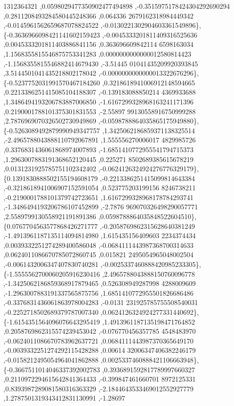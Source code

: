 \begin{DoxyCode}
      1312364321 ,0.0598029477350902477494898 ,-0.3515975178424304292690294 ,0.2811208493284580445248366 ,0.064336
      2679162318984449342 ,-0.0145961562659687078824522 ,-0.0130221302904603361549896\},
\{-0.3636966098421141602159423 ,-0.0045333201811409316525636 ,0.0045333201811403886841156 ,0.363696609842114
      6598163034 ,1.1568355815546875753341283 ,0.0000000000000012580814423 ,-1.1568355815546882414679430 ,-3.51445
      01041435209920393845 ,3.5144501041435218802178042 ,-0.0000000000000013322676296\},
\{-0.5237752031991570467184260 ,0.3218618941006912148594665 ,0.2213386251415085104188307 ,-0.139183088850214
      4369933688 ,1.3486494193206783887006850 ,-1.6167299328968163241171396 ,0.2190001788101375301831553 ,-2.55897
      99130558916750999288 ,2.7876969070326502730949869 ,-0.0598788864035865175949880\},
\{-0.5263089492879990949347757 ,1.3425062186859371138325514 ,-2.4965788043888110792067891 ,1.555556270006017
      4829985726 ,0.3376831436061868974007893 ,-1.6851410772955541794715373 ,1.2963007883191368652120445 ,0.225271
      8502689385615678219 ,0.0131231925785751102342402 ,-0.0624126324924276776329179\},
\{0.1391830888502155194608179 ,-0.2213386251415099814643384 ,-0.3218618941006907152591054 ,0.523775203199156
      8246738211 ,-0.2190001788101379742723651 ,1.6167299328968178784293741 ,-1.3486494193206786107452899 ,-2.7876
      969070326498290057771 ,2.5589799130558921191891386 ,0.0598788864035848522604510\},
\{0.0767704563577868426271777 ,-0.2058769862315628640381249 ,-1.4913961187135114094814980 ,1.615435156409603
      2234374434 ,0.0039332251274289400586048 ,-0.0684111443987368700314633 ,0.0624011086670785072860745 ,0.015821
      2495054965048002504 ,-0.0061432006347407830740281 ,-0.0025337460888420985233305\},
\{-1.5555562700060205916230416 ,2.4965788043888150760096778 ,-1.3425062186859368917879465 ,0.526308949287998
      4288009609 ,-1.2963007883191337565875756 ,1.6851410772955501826686486 ,-0.3376831436061863978004283 ,-0.0131
      231925785755508540031 ,-0.2252718502689379787007340 ,0.0624126324924277331440692\},
\{-1.6154351564096076643295419 ,1.4913961187135198471764852 ,0.2058769862315574239453042 ,-0.076770456357785
      4548483970 ,-0.0624011086670783962637721 ,0.0684111443987370365649170 ,-0.0039332251274292115428288 ,0.00614
      32006347406382246179 ,-0.0158212495054964041862888 ,0.0025337460888421106663948\},
\{-0.3667511014046337392002783 ,0.3936891592817789997660327 ,0.2110972294615642841364433 ,-0.399847461660701
      8972125331 ,0.8393987289081580316363329 ,-2.1844643533469012552927779 ,1.2787501319343412831130991 ,-1.28697

\end{DoxyCode}
